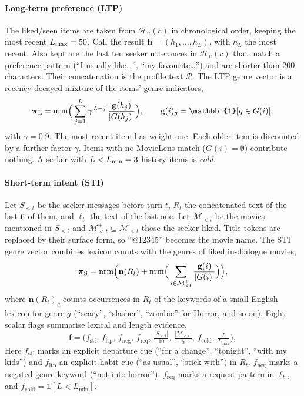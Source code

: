 \paragraph{Long-term preference (LTP)}
The liked/seen items are taken from $\mathcal{H}_u(c)$ in chronological order, keeping the most recent $L_{\max}=50$. Call the result $\mathbf{h}=(h_1,\dots,h_L)$, with $h_L$ the most recent. Also kept are the last ten seeker utterances in $\mathcal{H}_u(c)$ that match a preference pattern (``I usually like\ldots'', ``my favourite\ldots'') and are shorter than 200 characters. Their concatenation is the profile text $\mathcal{P}$. The LTP genre vector is a recency-decayed mixture of the items' genre indicators,
\begin{equation}
  \label{eq:piltp}
  \boldsymbol{\pi}_{\mathrm{L}}=\nrm\!\Big(\sum_{j=1}^{L}\gamma^{\,L-j}\,\frac{\mathbf{g}(h_j)}{|G(h_j)|}\Big),\qquad \mathbf{g}(i)_g=\mathbb{1}[g\in G(i)],
\end{equation}
with $\gamma=0.9$. The most recent item has weight one. Each older item is discounted by a further factor $\gamma$. Items with no MovieLens match ($G(i)=\emptyset$) contribute nothing. A seeker with $L<L_{\min}=3$ history items is \emph{cold}.

\paragraph{Short-term intent (STI)}
Let $S_{<t}$ be the seeker messages before turn $t$, $R_t$ the concatenated text of the last $6$ of them, and $\ell_t$ the text of the last one. Let $\mathcal{M}_{<t}$ be the movies mentioned in $S_{<t}$ and $\mathcal{M}^{+}_{<t}\subseteq\mathcal{M}_{<t}$ those the seeker liked. Title tokens are replaced by their surface form, so ``@12345'' becomes the movie name. The STI genre vector combines lexicon counts with the genres of liked in-dialogue movies,
\begin{equation}
  \label{eq:pisti}
  \boldsymbol{\pi}_{\mathrm{S}}=\operatorname{nrm}\!\Big(\mathbf{n}(R_t)+\operatorname{nrm}\!\Big(\sum_{i\in\mathcal{M}^{+}_{<t}}\frac{\mathbf{g}(i)}{|G(i)|}\Big)\Big),
\end{equation}
where $\mathbf{n}(R_t)_g$ counts occurrences in $R_t$ of the keywords of a small English lexicon for genre $g$ (``scary'', ``slasher'', ``zombie'' for Horror, and so on). Eight scalar flags summarise lexical and length evidence,
\begin{equation}
  \label{eq:flags}
  \mathbf{f}=\big(f_{\mathrm{sti}},\,f_{\mathrm{ltp}},\,f_{\mathrm{neg}},\,f_{\mathrm{req}},\,\tfrac{|S_{<t}|}{10},\,\tfrac{|\mathcal{M}_{<t}|}{5},\,f_{\mathrm{cold}},\,\tfrac{L}{L_{\max}}\big),
\end{equation}
Here $f_{\mathrm{sti}}$ marks an explicit departure cue (``for a change'', ``tonight'', ``with my kids'') and $f_{\mathrm{ltp}}$ an explicit habit cue (``as usual'', ``stick with'') in $R_t$. $f_{\mathrm{neg}}$ marks a negated genre keyword (``not into horror''). $f_{\mathrm{req}}$ marks a request pattern in $\ell_t$, and $f_{\mathrm{cold}}=\mathbb{1}[L<L_{\min}]$.

